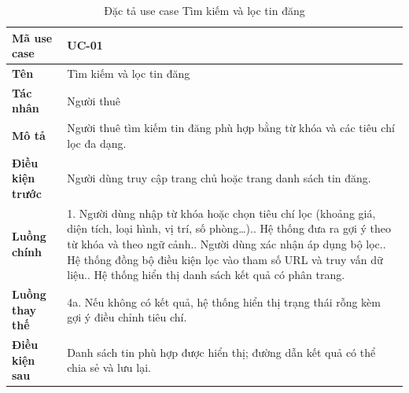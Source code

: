 \begin{table}[!ht]
\centering
\caption{Đặc tả use case Tìm kiếm và lọc tin đăng}
\label{tab:uc-search}
\begin{tabular}{p{} p{}}
\hline
\textbf{Mã use case} & UC-01 \\
\hline
\textbf{Tên} & Tìm kiếm và lọc tin đăng \\
\hline
\textbf{Tác nhân} & Người thuê \\
\hline
\textbf{Mô tả} & Người thuê tìm kiếm tin đăng phù hợp bằng từ khóa và các tiêu chí lọc đa dạng. \\
\hline
\textbf{Điều kiện trước} & Người dùng truy cập trang chủ hoặc trang danh sách tin đăng. \\
\hline
\textbf{Luồng chính} & 1. Người dùng nhập từ khóa hoặc chọn tiêu chí lọc (khoảng giá, diện tích, loại hình, vị trí, số phòng\ldots).\newline
2. Hệ thống đưa ra gợi ý theo từ khóa và theo ngữ cảnh.\newline
3. Người dùng xác nhận áp dụng bộ lọc.\newline
4. Hệ thống đồng bộ điều kiện lọc vào tham số URL và truy vấn dữ liệu.\newline
5. Hệ thống hiển thị danh sách kết quả có phân trang. \\
\hline
\textbf{Luồng thay thế} & 4a. Nếu không có kết quả, hệ thống hiển thị trạng thái rỗng kèm gợi ý điều chỉnh tiêu chí. \\
\hline
\textbf{Điều kiện sau} & Danh sách tin phù hợp được hiển thị; đường dẫn kết quả có thể chia sẻ và lưu lại. \\
\hline
\end{tabular}
\end{table}


